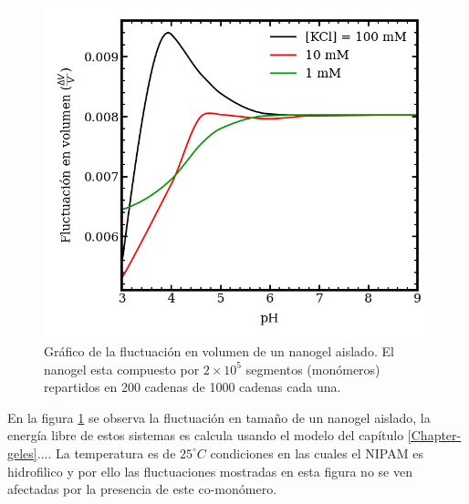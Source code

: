 \begin{figure}[!tb]
	\centering
	\includegraphics[width=1\linewidth]{Figures/graph-mc/dvv.png}
	\caption{Gr\'afico de la fluctuaci\'on en volumen de un nanogel aislado. El nanogel esta compuesto por $2\times 10^5$ segmentos (mon\'omeros) repartidos en 200 cadenas de 1000 cadenas cada una.}
	\label{fig:mc:dvvi}
\end{figure}
En la figura \ref{fig:mc:dvvi} se observa la fluctuaci\'on en tama\~no de un nanogel aislado, la energ\'ia libre de estos sistemas es calcula usando el modelo del cap\'itulo \ref{Chapter-geles}....
La temperatura es de $25 ^\circ C$ condiciones en las cuales el NIPAM es hidrofilico y por ello las fluctuaciones mostradas en esta figura no se ven afectadas por la presencia de este co-mon\'omero.

